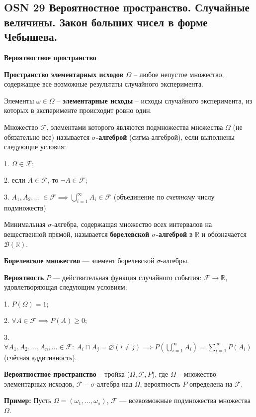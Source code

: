 \subsection{OSN 29 Вероятностное пространство. Случайные величины. Закон больших чисел в форме Чебышева.}

\centerline{\textbf{Вероятностное пространство}}

\textbf{Пространство элементарных исходов $\Omega$} -- любое непустое множество, содержащее все возможные результаты случайного эксперимента.

Элементы $\omega \in \Omega$ -- \textbf{элементарные исходы} -- исходы случайного эксперимента, из которых в эксперименте происходит ровно один. 

Множество $\mathcal{F}$, элементами которого являются подмножества множества $\Omega$ (не обязательно все) называется \textbf{$\sigma$-алгеброй} (сигма-алгеброй), если выполнены следующие условия:

1. $\Omega \in \mathcal{F}$;

2. если $A \in \mathcal{F}$, то $\neg A \in \mathcal{F}$;

3. $A_1,A_2,\dots~\in \mathcal{F} \implies \bigcup_{i=1}^{\infty} A_i \in \mathcal{F}$ (объединение по \textit{счетному} числу подмножеств)


Минимальная $\sigma$-алгебра, содержащая множество всех интервалов на вещественной прямой, называется \textbf{борелевской $\sigma$-алгеброй} в $\mathbb{R}$ и обозначается $\mathcal{B}(\mathbb{R})$. 

\textbf{Борелевское множество} --- элемент борелевской $\sigma$-алгебры.

\textbf{Вероятность} $P$ --- действительная функция случайного события: $\mathcal{F} \rightarrow \mathbb{R}$, удовлетворяющая следующим условиям:

1. $P(\Omega) = 1$;

2.  $\forall A \in \mathcal{F}\implies P(A) \geqslant 0$;

3. $\forall A_1,A_2,\dots,A_n,\dots \in \mathcal{F}:~A_i \cap A_j = \varnothing (i \neq j) \implies P(\displaystyle\bigcup_{i=1}^{\infty}A_i) = \displaystyle\sum_{i=1}^{\infty}P(A_i)$ (счётная аддитивность).


\textbf{Вероятностное пространство} -- тройка ($\Omega, \mathcal{F}, P$), где $\Omega$ -- множество элементарных исходов, $\mathcal{F}$ -- $\sigma$-алгебра над $\Omega$, вероятность $P$ определена на $\mathcal{F}$.

\textbf{Пример: }
Пусть $\Omega = (\omega_1,\dots,\omega_s)$, $\mathcal{F}$ --- всевозможные подмножества множества $\Omega$.

